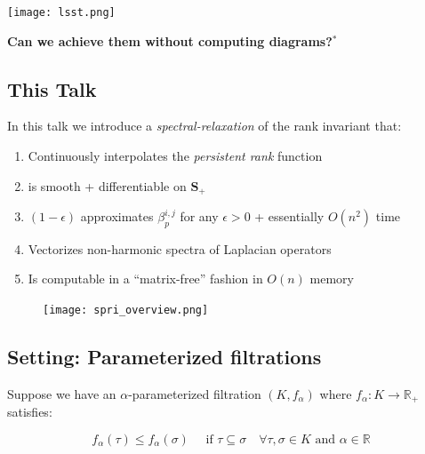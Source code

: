 \documentclass[
  letterpaper,
  DIV=11,
  numbers=noendperiod,
  oneside]{scrartcl}
\providecommand{\tightlist}{%
  \setlength{\itemsep}{0pt}\setlength{\parskip}{0pt}}\usepackage{longtable,booktabs,array}
\begin{document}
\texttt{[image: lsst.png]}

\textbf{Can we achieve them without computing diagrams?\(^\ast\)}


\hypertarget{this-talk}{%
\subsection{This Talk}\label{this-talk}}

In this talk we introduce a { \emph{spectral-relaxation} } of the rank
invariant that:

\begin{enumerate}
\def\labelenumi{\arabic{enumi}.}
\tightlist
\item
  Continuously interpolates the \emph{persistent rank} function
\item
  is smooth + differentiable on \(\mathbf{S}_+\)
\item
  \((1{\textstyle -}\epsilon)\) approximates \(\beta_p^{i,j}\) for any
  \(\epsilon > 0\) + essentially \(O(n^2)\) time
\item
  Vectorizes non-harmonic spectra of Laplacian operators
\item
  Is computable in a ``matrix-free'' fashion in \(O(n)\) memory
\end{enumerate}

\begin{figure}

{\centering \texttt{[image: spri\_overview.png]}

}

\end{figure}

\hypertarget{setting-parameterized-filtrations}{%
\subsection{Setting: Parameterized
filtrations}\label{setting-parameterized-filtrations}}

Suppose we have an \(\alpha\)-parameterized filtration \((K, f_\alpha)\)
where \(f_\alpha : K \to \mathbb{R}_+\) satisfies:

\[
f_\alpha(\tau) \leq f_\alpha(\sigma) \quad \text{ if } \tau \subseteq \sigma \quad \forall \tau,\sigma \in K \text{ and } \alpha \in \mathbb{R}
\]
\end{document}

